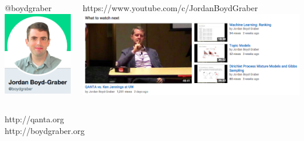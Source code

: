 \documentclass[xcolor=dvipsnames]{beamer}
\begin{document}
\begin{frame}[plain]

\begin{columns}
        \begin{center}
          @boydgraber
          \includegraphics[width=0.6\linewidth]{general_figures/twitter}
          \\
          \end{center}

  \begin{center}
    https://www.youtube.com/c/JordanBoydGraber
    \includegraphics[width=1.0\linewidth]{general_figures/youtube} \\

\end{center}

\end{columns}

\begin{center}
\huge
http://qanta.org \\
http://boydgraber.org
       \end{center}


\end{frame}
\end{document}

